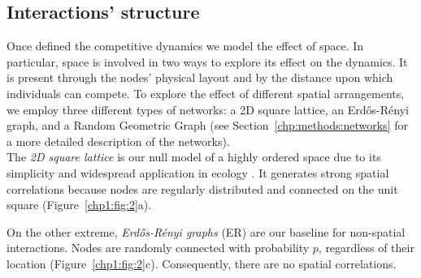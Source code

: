 
\subsection{Interactions' structure}
Once defined the competitive dynamics we model the effect of space. In particular, space is involved in two ways to explore its effect on the dynamics. It is present through the nodes' physical layout and by the distance upon which individuals can compete.
To explore the effect of different spatial arrangements, we employ three different types of networks: a 2D square lattice, an Erd{\H{o}}s-R{\'e}nyi graph, and a Random Geometric Graph (see Section~\ref{chp:methods:networks} for a more detailed description of the networks). \\

The \textit{2D square lattice} is our null model of a highly ordered space due to its simplicity and widespread application in ecology \cite{Dieckmann2000,grimm2005IBM,Lowery2019}. It generates strong spatial correlations because nodes are regularly distributed and connected on the unit square (Figure~\ref{chp1:fig:2}a). 

On the other extreme, \textit{Erd{\H{o}}s-R{\'e}nyi graphs} (ER)\cite{erdos1959random} are our baseline for non-spatial interactions. Nodes are randomly connected with probability $p$, regardless of their location (Figure~\ref{chp1:fig:2}c). Consequently, there are no spatial correlations.

